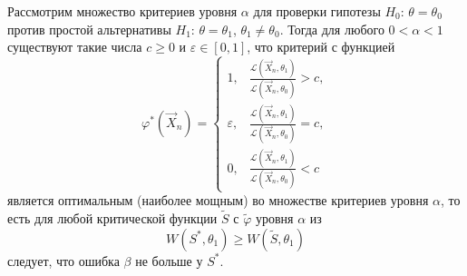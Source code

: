 \begin{theorem}\label{th:N-P}
	Рассмотрим множество критериев уровня $ \alpha $ для проверки гипотезы $ H_0
	$: $ \theta = \theta_0 $ против простой альтернативы $ H_1 $: $ \theta =
	\theta_1 $, $ \theta_1 \neq \theta_0 $. Тогда для любого $ 0 < \alpha < 1 $
	существуют такие числа $ c \geqslant 0 $ и $ \varepsilon \in [0, 1] $, что
	критерий с функцией  
	\[
	\varphi^\ast(\vec X_n) = \begin{cases} 1, & \frac{\mathscr L(\vec X_n,
		\theta_1)}{\mathscr L(\vec X_n, \theta_0)} > c,\\[0.4em]
		\varepsilon, & \frac{\mathscr L(\vec X_n, \theta_1)}{\mathscr L(\vec X_n, \theta_0)} =
		c,\\[0.4em]
		0, & \frac{\mathscr L(\vec X_n, \theta_1)}{\mathscr L(\vec X_n, \theta_0)} < c
	\end{cases}
	\]
является оптимальным (наиболее мощным) во множестве критериев уровня $ \alpha $,
то есть для любой критической функции $ \tilde S $ с $ \tilde \varphi $ уровня
$ \alpha$ из
\[
		W(S^\ast, \theta_1) \geqslant W(\tilde S, \theta_1)
\]
следует, что ошибка $ \beta $ не больше у $ S^\ast $.
\end{theorem}
